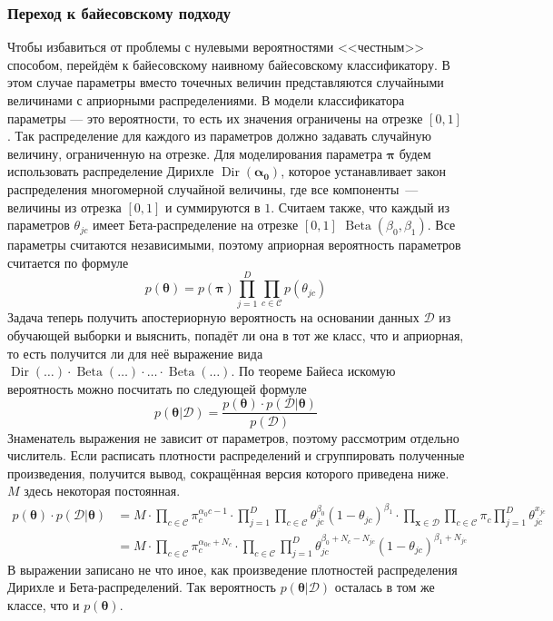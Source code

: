 \subsubsection{Переход к байесовскому подходу}\label{bnb}
Чтобы избавиться от проблемы с нулевыми вероятностями <<честным>> способом, перейдём к байесовскому
наивному байесовскому классификатору. В этом случае параметры вместо точечных величин представляются
случайными величинами с априорными распределениями. В модели классификатора параметры --- это
вероятности, то есть их значения ограничены на отрезке $[0,1]$. Так распределение для каждого из
параметров должно задавать случайную величину, ограниченную на отрезке. Для моделирования параметра
$\mathbf{\pi}$ будем использовать распределение Дирихле $\operatorname{Dir}(\mathbf{\alpha_0})$, которое
устанавливает закон распределения многомерной случайной величины, где все компоненты~--- величины из
отрезка $[0,1]$ и суммируются в $1$. Считаем также, что каждый из параметров $\theta_{jc}$ имеет
Бета-распределение на отрезке $[0,1]$ $\operatorname{Beta}(\beta_0,\beta_1)$. Все параметры
считаются независимыми, поэтому априорная вероятность параметров считается по формуле
\begin{equation}
  p(\mathbf{\theta}) = p(\mathbf{\pi})\prod_{j=1}^D\prod_{c\in\mathcal{C}}p(\theta_{jc})
  \label{eq:apr}
\end{equation}
Задача теперь получить апостериорную вероятность на основании данных $\mathcal{D}$ из обучающей
выборки и выяснить, попадёт ли она в тот же класс, что и априорная, то есть получится ли для неё
выражение вида
$\operatorname{Dir}(\ldots)\cdot\operatorname{Beta}(\ldots)\cdot\ldots\cdot\operatorname{Beta}(\ldots)$.
По теореме Байеса искомую вероятность можно посчитать по следующей формуле
\begin{equation}
  p(\mathbf{\theta}|\mathcal{D}) =
  \frac{p(\mathbf{\theta})\cdot p(\mathcal{D}|\mathbf{\theta})}{p(\mathcal{D})}
  \label{eq:apo}
\end{equation}
Знаменатель выражения не зависит от параметров, поэтому рассмотрим отдельно числитель. Если
расписать плотности распределений и сгруппировать полученные произведения, получится вывод,
сокращённая версия которого приведена ниже. $M$ здесь некоторая постоянная.
\begin{align}
  p(\mathbf{\theta}) \cdot p(\mathcal{D}|\mathbf{\theta})
  & =  M\cdot\prod_{c\in\mathcal{C}}\pi_c^{\alpha_0c-1}\cdot
  \prod_{j=1}^D\prod_{c\in\mathcal{C}}\theta_{jc}^{\beta_0}(1-\theta_{jc})^{\beta_1}\cdot
  \prod_{\mathbf{x}\in\mathcal{D}}\prod_{c\in\mathcal{C}}\pi_c\prod_{j=1}^D\theta_{jc}^{x_{jc}} \label{eq:plo1}\\
  & = M\cdot\prod_{c\in\mathcal{C}}\pi_c^{\alpha_{0c}+N_c}\cdot
  \prod_{c\in\mathcal{C}}\prod_{j=1}^D\theta_{jc}^{\beta_0+N_c-N_{jc}}(1-\theta_{jc})^{\beta_1+N_{jc}}
  \label{eq:plo2}
\end{align}
В выражении \label{eq:plo2} записано не что иное, как произведение плотностей распределения Дирихле и
Бета-распределений. Так вероятность $p(\mathbf{\theta}|\mathcal{D})$ осталась в том же классе, что и
$p(\mathbf{\theta})$.

